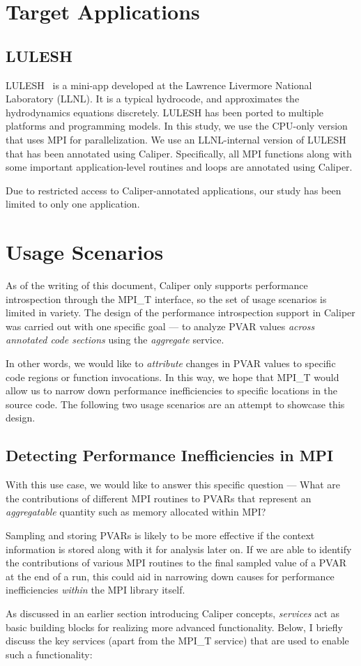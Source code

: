 \section{Target Applications}
\subsection{LULESH}
LULESH~\cite{LULESH} is a mini-app developed at the Lawrence Livermore National Laboratory (LLNL). It is a typical hydrocode, and approximates the hydrodynamics equations discretely. LULESH has been ported to multiple platforms and programming models. In this study, we use the CPU-only version that uses MPI for parallelization. We use an LLNL-internal version of LULESH that has been annotated using Caliper. Specifically, all MPI functions along with some important application-level routines and loops are annotated using Caliper.
\par Due to restricted access to Caliper-annotated applications, our study has been limited to only one application.

\section{Usage Scenarios}
As of the writing of this document, Caliper only supports performance introspection through the MPI\_T interface, so the set of usage scenarios is limited in variety. The design of the performance introspection support in Caliper was carried out with one specific goal --- to analyze PVAR values \textit{across annotated code sections} using the \textit{aggregate} service.
\par In other words, we would like to \textit{attribute} changes in PVAR values to specific code regions or function invocations. In this way, we hope that MPI\_T would allow us to narrow down performance inefficiencies to specific locations in the source code. The following two usage scenarios are an attempt to showcase this design.
\subsection{Detecting Performance Inefficiencies in MPI}
With this use case, we would like to answer this specific question --- What are the contributions of different MPI routines to PVARs that represent an \textit{aggregatable} quantity such as memory allocated within MPI?
\par Sampling and storing PVARs is likely to be more effective if the context information is stored along with it for analysis later on. If we are able to identify the contributions of various MPI routines to the final sampled value of a PVAR at the end of a run, this could aid in narrowing down causes for performance inefficiencies \textit{within} the MPI library itself. 
\par As discussed in an earlier section introducing Caliper concepts, \textit{services} act as basic building blocks for realizing more advanced functionality. Below, I briefly discuss the key services (apart from the MPI\_T service) that are used to enable such a functionality:
